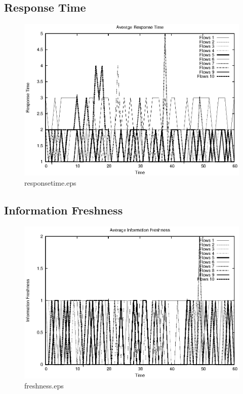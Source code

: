 \documentclass{elsart}
\begin{document}
\clearpage
\subsection{Response Time}

\begin{figure}[ht]
\centering
\includegraphics{Scenario4Direct/responsetime.eps}
\caption{responsetime.eps}\label{fig:responsetime}
\end{figure}

\clearpage
\subsection{Information Freshness}

\begin{figure}[ht]
\centering
\includegraphics{Scenario4Direct/freshness.eps}
\caption{freshness.eps}\label{fig:freshness}
\end{figure}
\end{document}
